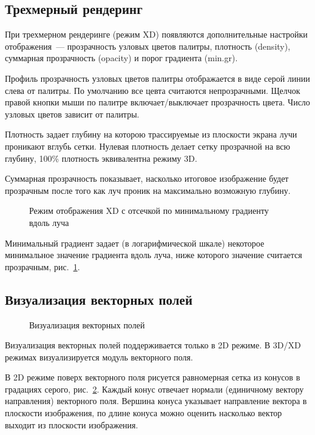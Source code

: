 \documentclass[12pt]{article}
\begin{document}
\subsection{Трехмерный рендеринг}
При трехмерном рендеринге (режим XD) появляются дополнительные настройки отображения~--- прозрачность узловых цветов палитры,
плотность (density), суммарная прозрачность (opacity) и порог градиента (min.gr).

Профиль прозрачность узловых цветов палитры отображается в виде серой линии слева от палитры. По умолчанию все цевта считаются непрозрачными.
Щелчок правой кнопки мыши по палитре включает/выключает прозрачность цвета. Число узловых цветов зависит от палитры.

Плотность задает глубину на которою трассируемые из плоскости экрана лучи проникают вглубь сетки. Нулевая плотность
делает сетку прозрачной на всю глубину, 100\% плотность эквивалентна режиму 3D.

Суммарная прозрачность показывает, насколько итоговое изображение будет прозрачным после того как луч проник на максимально возможную глубину.

\begin{figure}[hb]
  \begin{center}
  \end{center}
  \caption{Режим отображения XD с отсечкой по минимальному градиенту вдоль луча}\label{XD:grad:pict}
\end{figure}

Минимальный градиент задает (в логарифмической шкале) некоторое минимальное значение градиента вдоль луча, ниже которого значение считается прозрачным, рис.~\ref{XD:grad:pict}.

\subsection{Визуализация векторных полей}
\begin{figure}[h]
  \begin{center}
  \end{center}
  \caption{Визуализация векторных полей}\label{2D:grad:pict}
\end{figure}
Визуализация векторных полей поддерживается только в 2D режиме.
В 3D/XD режимах визуализируется модуль векторного поля. 

В 2D режиме поверх векторного поля рисуется равномерная сетка из конусов в градациях серого, рис.~\ref{2D:grad:pict}.
Каждый конус отвечает нормали (единичному вектору направления) векторного поля.
Вершина конуса указывает направление вектора в плоскости
изображения, по длине конуса можно оценить насколько вектор выходит из плоскости изображения.
\end{document}
